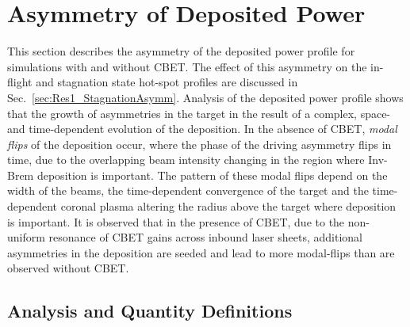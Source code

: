 \section{Asymmetry of Deposited Power}%
\label{sec:Res1_PdepR_CBET_asymm}

This section describes the asymmetry of the deposited power profile for simulations with and without \ac{CBET}.
The effect of this asymmetry on the in-flight and stagnation state hot-spot profiles are discussed in Sec.~\ref{sec:Res1_StagnationAsymm}.
Analysis of the deposited power profile shows that the growth of asymmetries in the target in the result of a complex, space- and time-dependent evolution of the deposition.
In the absence of \ac{CBET}, \textit{modal flips} of the deposition occur, where the phase of the driving asymmetry flips in time, due to the overlapping beam intensity changing in the region where \ac{Inv-Brem} deposition is important.
The pattern of these modal flips depend on the width of the beams, the time-dependent convergence of the target and the time-dependent coronal plasma altering the radius above the target where deposition is important.
It is observed that in the presence of \ac{CBET}, due to the non-uniform resonance of \ac{CBET} gains across inbound laser sheets, additional asymmetries in the deposition are seeded and lead to more modal-flips than are observed without \ac{CBET}.

\subsection{Analysis and Quantity Definitions}%
\label{sec:Res1_analysis_and_def}

